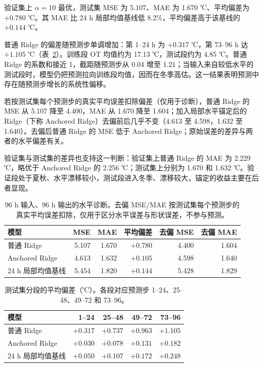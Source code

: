 \documentclass[UTF8,a4paper,11pt,fontset=windows]{ctexart}
\begin{document}
验证集上 $\alpha=10$ 最优，测试集 MSE 为 5.107、MAE 为 1.670 ℃、平均偏差为 $+0.780$ ℃。其 MAE 比 24 h 局部均值基线低 8.2\%，平均偏差高于该基线的 $+0.144$ ℃。

普通 Ridge 的偏差随预测步单调增加：第 1--24 h 为 $+0.317$ ℃，第 73--96 h 达 $+1.105$ ℃（表~\ref{tab:bias_segments}）。训练段 OT 均值约为 17.13 ℃，测试段约为 4.85 ℃。普通 Ridge 的系数和接近 1，截距随预测步从 0.04 增至 1.21；当输入来自较低水平的测试段时，模型仍把预测拉向训练段均值，因而在冬季高估。这一结果表明预测中存在随预测步增长的系统性偏移。

若按测试集每个预测步的真实平均误差扣除偏差（仅用于诊断），普通 Ridge 的 MSE 从 5.107 降至 4.400，MAE 从 1.670 降至 1.604；加入局部水平锚定后的 Ridge（下称 Anchored Ridge）去偏前后几乎不变（4.613 至 4.598，1.632 至 1.640）。去偏后普通 Ridge 的 MSE 低于 Anchored Ridge；原始误差的差异与两者的水平偏差有关。

验证集与测试集的差异也支持这一判断：验证集上普通 Ridge 的 MAE 为 2.229 ℃，略优于 Anchored Ridge 的 2.256 ℃；测试集上分别为 1.670 和 1.632 ℃。验证段处于夏秋、水平漂移较小，测试段进入冬季、漂移较大，锚定的收益主要在后者显现。

\begin{table}[htbp]
\centering\small
\caption{96 h 输入、96 h 输出的水平诊断。去偏 MSE/MAE 按测试集每个预测步的真实平均误差扣除，仅用于区分水平误差与形状误差，不参与预测。}
\label{tab:level_diag}
\begin{tabular}{lrrrrr}
\toprule 模型 & MSE & MAE & 平均偏差 & 去偏 MSE & 去偏 MAE\\\midrule
普通 Ridge & 5.107 & 1.670 & $+0.780$ & 4.400 & 1.604\\
Anchored Ridge & 4.613 & 1.632 & $+0.105$ & 4.598 & 1.640\\
24 h 局部均值基线 & 5.454 & 1.820 & $+0.144$ & 5.428 & 1.829\\\bottomrule
\end{tabular}
\end{table}

\begin{table}[htbp]
\centering\small
\caption{测试集分段的平均偏差（℃）。各段对应预测步 1--24、25--48、49--72 和 73--96。}
\label{tab:bias_segments}
\begin{tabular}{lrrrr}
\toprule 模型 & 1--24 & 25--48 & 49--72 & 73--96\\\midrule
普通 Ridge & $+0.317$ & $+0.737$ & $+0.963$ & $+1.105$\\
Anchored Ridge & $+0.030$ & $+0.078$ & $+0.131$ & $+0.182$\\
24 h 局部均值基线 & $+0.050$ & $+0.107$ & $+0.172$ & $+0.248$\\\bottomrule
\end{tabular}
\end{table}
\end{document}
